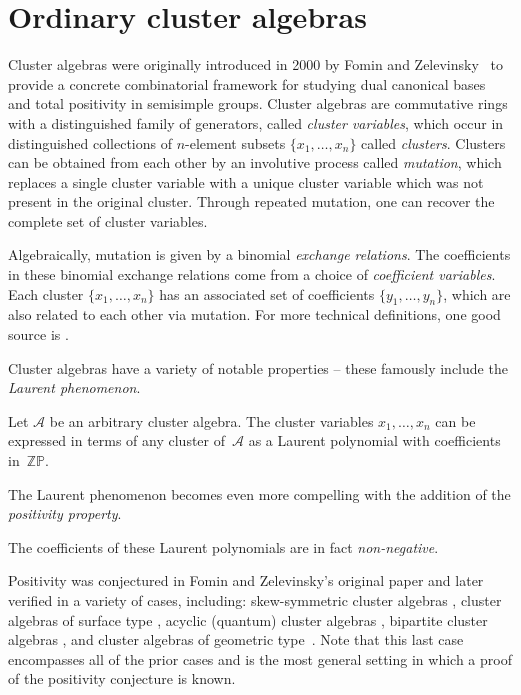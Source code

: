 \section{Ordinary cluster algebras}\label{sec:ordinaryClusterAlgebras}

Cluster algebras were originally introduced in 2000 by Fomin and Zelevinsky~\cite{Fomin-Zelevinsky-I} to provide a concrete combinatorial framework for studying dual canonical bases and total positivity in semisimple groups. Cluster algebras are commutative rings with a distinguished family of ge\-nerators, called \emph{cluster variables}, which occur in distinguished collections of $n$-element subsets $\{x_1, \dots, x_n \}$ called \emph{clusters}. Clusters can be obtained from each other by an involutive process called \emph{mutation}, which replaces a single cluster variable with a unique cluster variable which was not present in the original cluster. Through repeated mutation, one can recover the complete set of cluster variables.

Algebraically, mutation is given by a binomial \emph{exchange relations}. The coefficients in these binomial exchange relations come from a choice of \emph{coefficient variables}. Each cluster $\{ x_1, \dots, x_n \}$ has an associated set of coefficients $\{y_1, \dots, y_n \}$, which are also related to each other via mutation. For more technical definitions, one good source is \cite[Section~2]{Fomin-Zelevinsky-IV}.

Cluster algebras have a variety of notable properties -- these famously include the \emph{Laurent phenomenon}.

\begin{Theorem}
Let $\mathcal{A}$ be an arbitrary cluster algebra. The cluster variables $x_1, \dots, x_n$ can be expressed in terms of any cluster of~$\mathcal{A}$ as a Laurent polynomial with coefficients in~$\mathbb{ZP}$.
\end{Theorem}

The Laurent phenomenon becomes even more compelling with the addition of the \emph{positivity property}.

\begin{Conjecture}
The coefficients of these Laurent polynomials are in fact \emph{non-negative}.
\end{Conjecture}

Positivity was conjectured in Fomin and Zelevinsky's original paper \cite{Fomin-Zelevinsky-I} and later verified in a variety of cases, including: skew-symmetric cluster algebras \cite{Lee-Schiffler}, cluster algebras of surface type \cite{MSW, Schiffler, Schiffler-Thomas}, acyclic (quantum) cluster algebras \cite{Caldero-Reineke, Efimov,Kimura-Qin, Qin}, bipartite cluster algebras \cite{Nakajima}, and cluster algebras of geometric type~\cite{GHKK}. Note that this last case encompasses all of the prior cases and is the most general setting in which a proof of the positivity conjecture is known.

